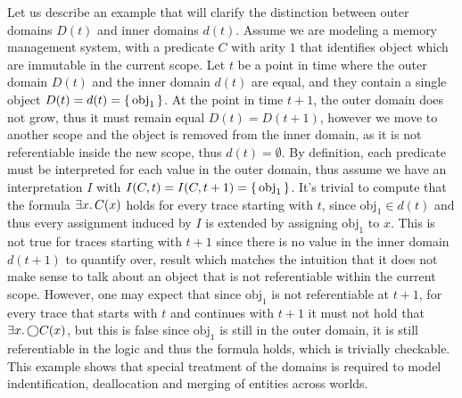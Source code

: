 \begin{example}\label{ex:domains}
  Let us describe an example that will clarify the distinction between outer domains $D(t)$ and inner domains $d(t)$.
  Assume we are modeling a memory management system, with a predicate $C$ with arity $1$ that identifies object which
  are immutable in the current scope. Let $t$ be a point in time where the outer domain $D(t)$ and the inner domain
  $d(t)$ are equal, and they contain a single object $D(t) = d(t) = \set{\text{obj}_1}$.  At the point in time $t + 1$,
  the outer domain does not grow, thus it must remain equal $D(t) = D(t + 1)$, however we move to another scope and the
  object is removed from the inner domain, as it is not referentiable inside the new scope, thus $d(t) = \emptyset$. By
  definition, each predicate must be interpreted for each value in the outer domain, thus assume we have an
  interpretation $I$ with $I(C, t) = I(C, t + 1) = \set{\text{obj}_1}$. It's trivial to compute that the formula
  $\exists {x} \ldotp {C(x)}$ holds for every trace starting with $t$, since $\text{obj}_1 \in d(t)$ and thus every assignment
  induced by $I$ is extended by assigning $\text{obj}_1$ to $x$. This is not true for traces starting with $t + 1$ since
  there is no value in the inner domain $d(t + 1)$ to quantify over, result which matches the intuition that it does not
  make sense to talk about an object that is not referentiable within the current scope. However, one may expect that
  since $\text{obj}_1$ is not referentiable at $t + 1$, for every trace that starts with $t$ and continues with $t + 1$
  it must not hold that $\exists {x} \ldotp {\bigcirc{C(x)}}$, but this is false since $\text{obj}_1$ is still in the outer
  domain, it is still referentiable in the logic and thus the formula holds, which is trivially checkable. This example
  shows that special treatment of the domains is required to model indentification, deallocation and merging of entities
  across worlds.
\end{example}

